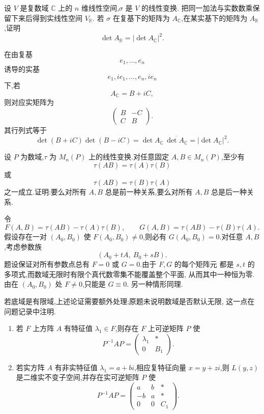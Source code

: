 \begin{example}
设 $V$ 是复数域 $\mathbb{C}$ 上的 $n$ 维线性空间,$\sigma$ 是 $V$ 的线性变换.
把同一加法与实数数乘保留下来后得到实线性空间 $V_{\mathbb{R}}$.
若 $\sigma$ 在复基下的矩阵为 $A_{\mathbb{C}}$,在某实基下的矩阵为
$A_{\mathbb{R}}$,证明
\[
\det A_{\mathbb{R}}
=
|\det A_{\mathbb{C}}|^2.
\]
\end{example}
\exampleblank

\begin{solution}
在由复基
\[
e_1,\ldots,e_n
\]
诱导的实基
\[
e_1,ie_1,\ldots,e_n,ie_n
\]
下,若
\[
A_{\mathbb{C}}=B+iC,
\]
则对应实矩阵为
\[
\begin{pmatrix}
B&-C\\
C&B
\end{pmatrix}.
\]
其行列式等于
\[
\det(B+iC)\det(B-iC)
=
\det A_{\mathbb{C}}\,
\overline{\det A_{\mathbb{C}}}
=
|\det A_{\mathbb{C}}|^2.
\]
\end{solution}


\begin{example}
设 $P$ 为数域,$\tau$ 为 $M_n(P)$ 上的线性变换.对任意固定
$A,B\in M_n(P)$,至少有
\[
\tau(AB)=\tau(A)\tau(B)
\]
或
\[
\tau(AB)=\tau(B)\tau(A)
\]
之一成立.证明:要么对所有 $A,B$ 总是前一种关系,要么对所有 $A,B$
总是后一种关系.
\end{example}
\exampleblank

\begin{solution}
令
\[
F(A,B)=\tau(AB)-\tau(A)\tau(B),
\qquad
G(A,B)=\tau(AB)-\tau(B)\tau(A).
\]
假设存在一对 $(A_0,B_0)$ 使 $F(A_0,B_0)\neq0$,则必有
$G(A_0,B_0)=0$.对任意 $A,B$,考虑参数族
\[
(A_0+tA,\ B_0+sB).
\]
题设保证对所有参数点总有 $F=0$ 或 $G=0$.由于 $F,G$ 的每个矩阵元
都是 $s,t$ 的多项式,而数域无限时有限个真代数零集不能覆盖整个平面,
从而其中一种恒为零.由在 $(A_0,B_0)$ 处 $F\neq0$,只能是 $G\equiv0$.
另一种情形同理.

若底域是有限域,上述论证需要额外处理;原题未说明数域是否默认无限,
这一点在问题记录中注明.
\end{solution}


\begin{lemma}[\markstar]
\leavevmode
\begin{enumerate}
    \item 若 $F$ 上方阵 $A$ 有特征值 $\lambda_1\in F$,则存在 $F$ 上可逆矩阵 $P$ 使
    \[
    P^{-1}AP=
    \begin{pmatrix}
    \lambda_1&*\\
    0&B_1
    \end{pmatrix}.
    \]
    \item 若实方阵 $A$ 有非实特征值 $\lambda_1=a+bi$,相应复特征向量
    $x=y+zi$,则 $L(y,z)$ 是二维实不变子空间,并存在实可逆矩阵 $P$ 使
    \[
    P^{-1}AP=
    \begin{pmatrix}
    a&b&*\\
    -b&a&*\\
    0&0&C_1
    \end{pmatrix}.
    \]
\end{enumerate}
\end{lemma}


